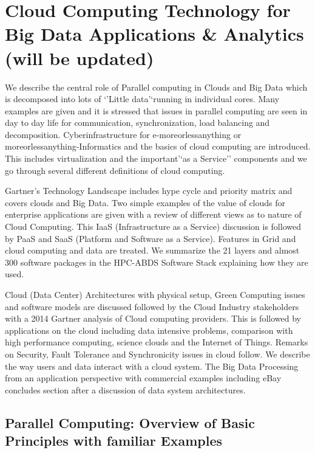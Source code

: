 \FILENAME

\section{Cloud Computing Technology for Big Data Applications \&
Analytics (will be
updated)}\label{cloud-computing-technology-for-big-data-applications-analytics-will-be-updated}

We describe the central role of Parallel computing in Clouds and Big
Data which is decomposed into lots of `'Little data'`running in
individual cores. Many examples are given and it is stressed that issues
in parallel computing are seen in day to day life for communication,
synchronization, load balancing and decomposition. Cyberinfrastructure
for e-moreorlessanything or moreorlessanything-Informatics and the
basics of cloud computing are introduced. This includes virtualization
and the important'`as a Service'' components and we go through several
different definitions of cloud computing.

Gartner's Technology Landscape includes hype cycle and priority matrix
and covers clouds and Big Data. Two simple examples of the value of
clouds for enterprise applications are given with a review of different
views as to nature of Cloud Computing. This IaaS (Infrastructure as a
Service) discussion is followed by PaaS and SaaS (Platform and Software
as a Service). Features in Grid and cloud computing and data are
treated. We summarize the 21 layers and almost 300 software packages in
the HPC-ABDS Software Stack explaining how they are used.

Cloud (Data Center) Architectures with physical setup, Green Computing
issues and software models are discussed followed by the Cloud Industry
stakeholders with a 2014 Gartner analysis of Cloud computing providers.
This is followed by applications on the cloud including data intensive
problems, comparison with high performance computing, science clouds and
the Internet of Things. Remarks on Security, Fault Tolerance and
Synchronicity issues in cloud follow. We describe the way users and data
interact with a cloud system. The Big Data Processing from an
application perspective with commercial examples including eBay
concludes section after a discussion of data system architectures.

\subsection{Parallel Computing: Overview of Basic Principles with
familiar
Examples}\label{parallel-computing-overview-of-basic-principles-with-familiar-examples}

